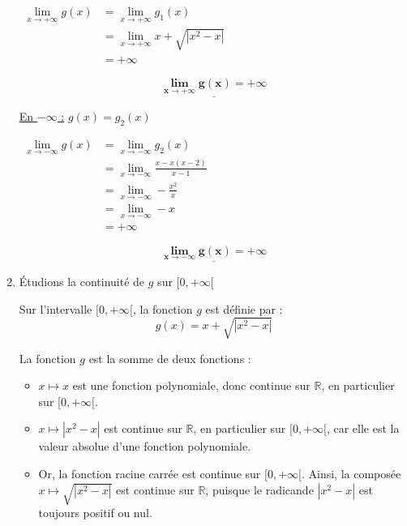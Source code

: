 \documentclass[12pt,a4paper]{article}
\begin{document}
\begin{enumerate}
										\(
									\begin{aligned}
											\lim\limits_{x \to +\infty}g(x) &= \lim\limits_{x \to +\infty}g_{1}(x)\\
																											&= \lim\limits_{x \to +\infty}x + \sqrt{|x^2 - x|}\\
																											&=+\infty
									\end{aligned}
									\)    
 
										\begin{resultbox}
                        \[
                            \mathbf{ \underline{\lim\limits_{x \to +\infty}g(x) = +\infty} }
                        \]
                    \end{resultbox}   
    
    		\underline{En $-\infty$ :} $g(x) = g_{2}(x)$

										\(
									\begin{aligned}
											\lim\limits_{x \to -\infty}g(x) &= \lim\limits_{x \to -\infty}g_{2}(x)\\
																											&= \lim\limits_{x \to -\infty}\frac{x - x(x-2)}{x - 1}\\
																											&=\lim\limits_{x \to -\infty}-\frac{x^{2}}{x}\\
																											&=\lim\limits_{x \to -\infty}-x\\
																											&=+\infty
									\end{aligned}
									\)    

											\begin{resultbox}
                        \[
                            \mathbf{ \underline{\lim\limits_{x \to -\infty}g(x) = +\infty} }
                        \]
                    \end{resultbox}
    \item Étudions la continuité de \( g \) sur \( [0, +\infty[ \)    
    
Sur l'intervalle $[0, +\infty[$, la fonction $g$ est définie par : 
\[
g(x) = x + \sqrt{|x^2 - x|}
\]

La fonction $g$ est la somme de deux fonctions :

\begin{itemize}
    \item $x \mapsto x$ est une fonction polynomiale, donc continue sur $\mathbb{R}$, en particulier sur $[0, +\infty[$.
    \item $x \mapsto |x^2 - x|$ est continue sur $\mathbb{R}$, en particulier sur $[0, +\infty[$, car elle est la valeur absolue d'une fonction polynomiale.
    \item Or, la fonction racine carrée est continue sur $[0, +\infty[$. Ainsi, la composée $x \mapsto \sqrt{|x^2 - x|}$ est continue sur $\mathbb{R}$, puisque le radicande $|x^2 - x|$ est toujours positif ou nul.
\end{itemize}


\end{enumerate}
\end{document}

